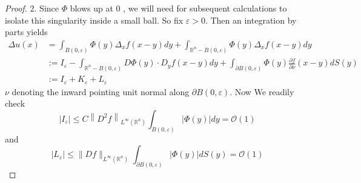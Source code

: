 \begin{theorem}
\begin{proof}
        2. Since $\Phi$ blows up at 0 , we will need for subsequent calculations to isolate this singularity inside a small ball. So fix $\varepsilon>0$. Then an integration by parts yields
        \begin{equation*}
            \begin{aligned}
                \Delta u(x) & =\int_{B(0, \varepsilon)} \Phi(y) \Delta_x f(x-y) d y+\int_{\mathbb{R}^n-B(0, \varepsilon)} \Phi(y) \Delta_x f(x-y) d y \\
                            & := I_{\varepsilon} -\int_{\mathbb{R}^n-B(0, \varepsilon)} D \Phi(y) \cdot D_y f(x-y) d y
                +\int_{\partial B(0, \varepsilon)} \Phi(y) \frac{\partial f}{\partial \nu}(x-y) d S(y)                                                \\
                            & :=I_\varepsilon +K_\varepsilon + L_\varepsilon
            \end{aligned}
        \end{equation*}
        $\nu$ denoting the inward pointing unit normal along $\partial B(0, \varepsilon)$.
        Now We readily check
        \begin{equation*}
            \left|I_{\varepsilon}\right| \leq C\left\|D^2 f\right\|_{L^{\infty}\left(\mathbb{R}^n\right)} \int_{B(0, \varepsilon)}|\Phi(y)| d y
            = \mathcal{O}(1)
        \end{equation*}
        and
        \begin{equation*}
            \left|L_{\varepsilon}\right| \leq\|D f\|_{L^{\infty}\left(\mathbb{R}^n\right)} \int_{\partial B(0, \varepsilon)}|\Phi(y)| d S(y)
            = \mathcal{O}(1)
        \end{equation*}


\end{proof}
\end{theorem}
